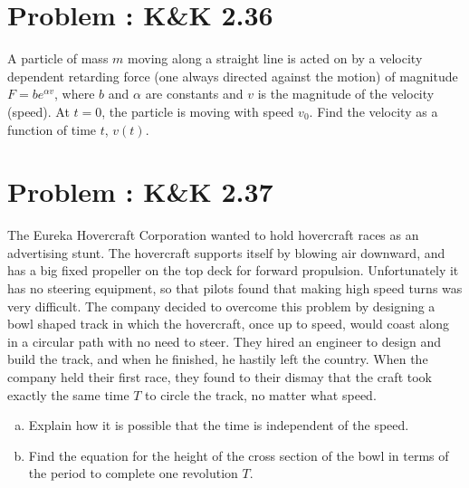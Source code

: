 \documentclass[problems]{esg8012pset}
\begin{document}
\section{Problem \thesection: K\&K 2.36}
  A particle of mass $m$ moving along a straight line is acted on by a velocity dependent retarding force (one always directed against the motion) of magnitude $F = be^{\alpha v}$, where $b$ and $\alpha$ are constants and $v$ is the magnitude of the velocity (speed). At $t = 0$, the particle is moving with speed $v_0$. Find the velocity as a function of time $t$, $v(t)$.
\section{Problem \thesection: K\&K 2.37}
  The Eureka Hovercraft Corporation wanted to hold hovercraft races as an advertising stunt. The hovercraft supports itself by blowing air downward, and has a big fixed propeller on the top deck for forward propulsion. Unfortunately it has no steering equipment, so that pilots found that making high speed turns was very difficult. The company decided to overcome this problem by designing a bowl shaped track in which the hovercraft, once up to speed, would coast along in a circular path with no need to steer. They hired an engineer to design and build the track, and when he finished, he hastily left the country. When the company held their first race, they found to their dismay that the craft took exactly the same time $T$ to circle the track, no matter what speed.
  \begin{enumerate}[a)]
    \item Explain how it is possible that the time is independent of the speed.
    \item Find the equation for the height of the cross section of the bowl in terms of the period to complete one revolution $T$.
  \end{enumerate}
\end{document}
